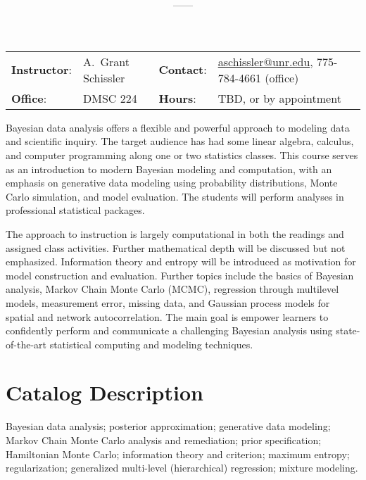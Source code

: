 \documentclass[11pt,onecolumn]{article}
\title{\textbf{\coursename}}
\author{{\semester}---{\roomnumb}---{\classtimes}}
\date{}
\makeatletter
\newcommand{\myname}{A.~Grant Schissler}
\newcommand{\myemail}{aschissler@unr.edu}
\newcommand{\office}{DMSC 224}
\newcommand{\officehours}{TBD, or by appointment}
\makeatother
\begin{document}
\maketitle

\vspace{-0.25in}
\noindent\makebox[\linewidth]{\rule{\textwidth}{1pt}}

\begin{center}
\begin{tabular}{llll}
\textbf{Instructor}:&\myname & \textbf{Contact}:&\href{mailto:\myemail}{\myemail}, 775-784-4661 (office)\\
\textbf{Office}:&\office & \textbf{Hours}:&\officehours\\
\end{tabular}
\end{center}

Bayesian data analysis offers a flexible and powerful approach to modeling data and scientific inquiry. The target audience has had some linear algebra, calculus, and computer programming along one or two statistics classes. This course serves as an introduction to modern Bayesian modeling and computation, with an emphasis on generative data modeling using probability distributions, Monte Carlo simulation, and model evaluation. The students will perform analyses in professional statistical packages.

The approach to instruction is largely computational in both the readings and assigned class activities. Further mathematical depth will be discussed but not emphasized. Information theory and entropy will be introduced as motivation for model construction and evaluation. Further topics include the basics of Bayesian analysis, Markov Chain Monte Carlo (MCMC), regression through multilevel models, measurement error, missing data, and Gaussian process models for spatial and network autocorrelation. The main goal is empower learners to confidently perform and communicate a challenging Bayesian analysis using state-of-the-art statistical computing and modeling techniques.

\section*{Catalog Description}
Bayesian data analysis; posterior approximation; generative data modeling; Markov Chain Monte Carlo analysis and remediation; prior specification; Hamiltonian Monte Carlo; information theory and criterion; maximum entropy; regularization; generalized multi-level (hierarchical) regression; mixture modeling.
\end{document}
